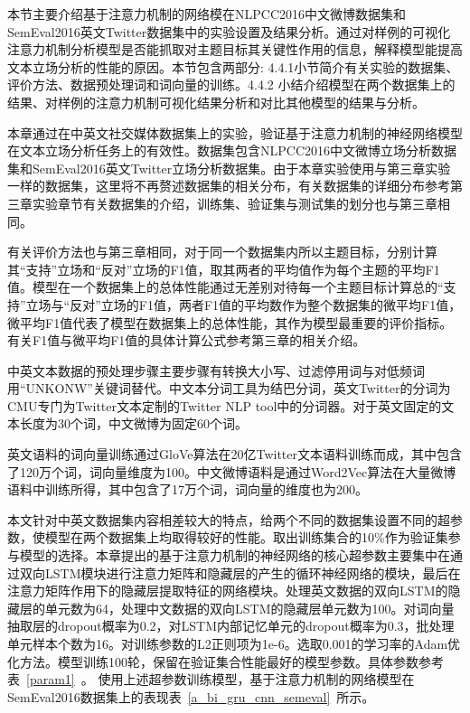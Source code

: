
本节主要介绍基于注意力机制的网络模在NLPCC2016中文微博数据集和SemEval2016英文Twitter数据集中的实验设置及结果分析。通过对样例的可视化注意力机制分析模型是否能抓取对主题目标其关键性作用的信息，解释模型能提高文本立场分析的性能的原因。本节包含两部分: 4.4.1小节简介有关实验的数据集、评价方法、数据预处理词和词向量的训练。4.4.2 小结介绍模型在两个数据集上的结果、对样例的注意力机制可视化结果分析和对比其他模型的结果与分析。



本章通过在中英文社交媒体数据集上的实验，验证基于注意力机制的神经网络模型在文本立场分析任务上的有效性。数据集包含NLPCC2016中文微博立场分析数据集和SemEval2016英文Twitter立场分析数据集。由于本章实验使用与第三章实验一样的数据集，这里将不再赘述数据集的相关分布，有关数据集的详细分布参考第三章实验章节有关数据集的介绍，训练集、验证集与测试集的划分也与第三章相同。

有关评价方法也与第三章相同，对于同一个数据集内所以主题目标，分别计算其“支持”立场和“反对”立场的F1值，取其两者的平均值作为每个主题的平均F1值。模型在一个数据集上的总体性能通过无差别对待每一个主题目标计算总的“支持”立场与“反对”立场的F1值，两者F1值的平均数作为整个数据集的微平均F1值，微平均F1值代表了模型在数据集上的总体性能，其作为模型最重要的评价指标。有关F1值与微平均F1值的具体计算公式参考第三章的相关介绍。

中英文本数据的预处理步骤主要步骤有转换大小写、过滤停用词与对低频词用“UNKONW”关键词替代。中文本分词工具为结巴分词，英文Twitter的分词为CMU专门为Twitter文本定制的Twitter NLP tool中的分词器。对于英文固定的文本长度为30个词，中文微博为固定60个词。

英文语料的词向量训练通过GloVe算法在20亿Twitter文本语料训练而成，其中包含了120万个词，词向量维度为100。中文微博语料是通过Word2Vec算法在大量微博语料中训练所得，其中包含了17万个词，词向量的维度也为200。


本文针对中英文数据集内容相差较大的特点，给两个不同的数据集设置不同的超参数，使模型在两个数据集上均取得较好的性能。取出训练集合的10\%作为验证集参与模型的选择。本章提出的基于注意力机制的神经网络的核心超参数主要集中在通过双向LSTM模块进行注意力矩阵和隐藏层的产生的循环神经网络的模块，最后在注意力矩阵作用下的隐藏层提取特征的网络模块。处理英文数据的双向LSTM的隐藏层的单元数为64，处理中文数据的双向LSTM的隐藏层单元数为100。对词向量抽取层的dropout概率为0.2，对LSTM内部记忆单元的dropout概率为0.3，批处理单元样本个数为16。对训练参数的L2正则项为1e-6。选取0.001的学习率的Adam优化方法。模型训练100轮，保留在验证集合性能最好的模型参数。具体参数参考表~\ref{param1}~。
使用上述超参数训练模型，基于注意力机制的网络模型在SemEval2016数据集上的表现表~\ref{a_bi_gru_cnn_semeval}~所示。

